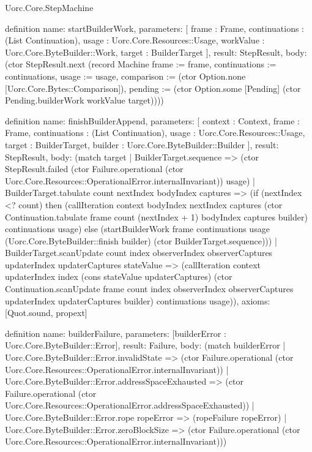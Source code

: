\begin{lexlean}{Uorc.Core.StepMachine}
\begin{semanticmodule}
definition{
  name: startBuilderWork,
  parameters: [
    frame : Frame,
    continuations : (List Continuation),
    usage : Uorc.Core.Resources::Usage,
    workValue : Uorc.Core.ByteBuilder::Work,
    target : BuilderTarget
  ],
  result: StepResult,
  body: (ctor StepResult.next (record Machine {frame := frame, continuations := continuations, usage := usage, comparison := (ctor Option.none [Uorc.Core.Bytes::Comparison]), pending := (ctor Option.some [Pending] (ctor Pending.builderWork workValue target))}))
}

definition{
  name: finishBuilderAppend,
  parameters: [
    context : Context,
    frame : Frame,
    continuations : (List Continuation),
    usage : Uorc.Core.Resources::Usage,
    target : BuilderTarget,
    builder : Uorc.Core.ByteBuilder::Builder
  ],
  result: StepResult,
  body: (match target
    | BuilderTarget.sequence => (ctor StepResult.failed (ctor Failure.operational (ctor Uorc.Core.Resources::OperationalError.internalInvariant)) usage)
    | BuilderTarget.tabulate count nextIndex bodyIndex captures => (if (nextIndex <? count) then (callIteration context bodyIndex nextIndex captures (ctor Continuation.tabulate frame count (nextIndex + 1) bodyIndex captures builder) continuations usage) else (startBuilderWork frame continuations usage (Uorc.Core.ByteBuilder::finish builder) (ctor BuilderTarget.sequence)))
    | BuilderTarget.scanUpdate count index observerIndex observerCaptures updaterIndex updaterCaptures stateValue => (callIteration context updaterIndex index (cons stateValue updaterCaptures) (ctor Continuation.scanUpdate frame count index observerIndex observerCaptures updaterIndex updaterCaptures builder) continuations usage)),
  axioms: [Quot.sound, propext]
}

definition{
  name: builderFailure,
  parameters: [builderError : Uorc.Core.ByteBuilder::Error],
  result: Failure,
  body: (match builderError
    | Uorc.Core.ByteBuilder::Error.invalidState => (ctor Failure.operational (ctor Uorc.Core.Resources::OperationalError.internalInvariant))
    | Uorc.Core.ByteBuilder::Error.addressSpaceExhausted => (ctor Failure.operational (ctor Uorc.Core.Resources::OperationalError.addressSpaceExhausted))
    | Uorc.Core.ByteBuilder::Error.rope ropeError => (ropeFailure ropeError)
    | Uorc.Core.ByteBuilder::Error.zeroBlockSize => (ctor Failure.operational (ctor Uorc.Core.Resources::OperationalError.internalInvariant)))
}


\end{semanticmodule}
\end{lexlean}
